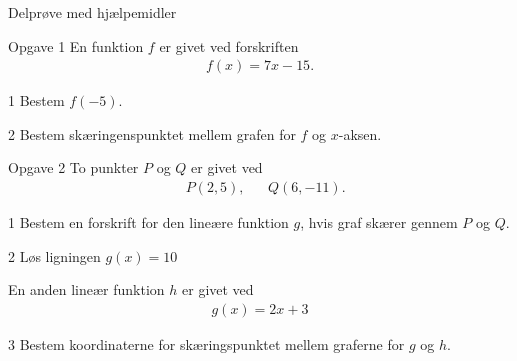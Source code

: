 \documentclass[12pt,x11names,a4paper]{article}
\begin{document}
\begin{center}
\LARGE
Delprøve med hjælpemidler 
\end{center}
\begin{opgavetekst}{Opgave 1}
	En funktion $f$ er givet ved forskriften
	\begin{align*}
		f(x) = 7x-15.
	\end{align*}
\end{opgavetekst}
\begin{delopgave}{}{1}
	Bestem $f(-5)$.
\end{delopgave}
\begin{delopgave}{}{2}
	Bestem skæringenspunktet mellem grafen for $f$ og $x$-aksen. 
\end{delopgave}
\begin{opgavetekst}{Opgave 2}
	To punkter $P$ og $Q$ er givet ved
	\begin{align*}
		&P(2,5), &&Q(6,-11).
	\end{align*}
\end{opgavetekst}
\begin{delopgave}{}{1}
	Bestem en forskrift for den lineære funktion $g$, hvis graf skærer gennem $P$ og $Q$. 
\end{delopgave}
\begin{delopgave}{}{2}
	Løs ligningen $g(x) = 10$
\end{delopgave}
\begin{meretekst}
	En anden lineær funktion $h$ er givet ved
	\begin{align*}
		g(x) = 2x+3
	\end{align*}
\end{meretekst}
\begin{delopgave}{}{3}
	Bestem koordinaterne for skæringspunktet mellem graferne for $g$ og $h$. 
\end{delopgave}
\end{document}
